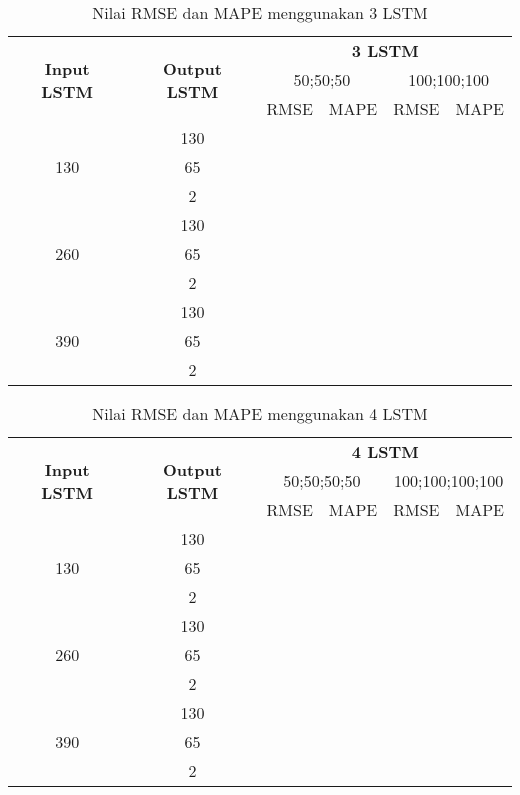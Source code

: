 \documentclass[../thesis.tex]{subfiles}
\begin{document}
\begin{table}[htp]
	\centering
	\begin{tabular}{|c|c|c|c|c|c|}
		\hline 
		\multirow{3}{*}{\textbf{Input LSTM}} & \multirow{3}{*}{\textbf{Output LSTM}} & \multicolumn{4}{c|}{\textbf{3 LSTM}} \\ \cline{3-6}
		&  & \multicolumn{2}{c|}{50;50;50}& \multicolumn{2}{c|}{100;100;100} \\ \cline{3-6}
		& & RMSE & MAPE& RMSE & MAPE\\
		\hline
		\multirow{3}{*}{130} & 130 & & & & \\
		& 65 & & & & \\
		& 2 & & & & \\
		\hline
		\multirow{3}{*}{260} & 130 & & & & \\
		& 65 & & & & \\
		& 2 & & & & \\
		\hline
		\multirow{3}{*}{390} & 130 & & & & \\
		& 65 & & & & \\
		& 2 & & & & \\
		\hline
	\end{tabular}
	\caption{Nilai RMSE dan MAPE menggunakan 3 LSTM}
	\label{3LSTM_result}
	\end{table} 

\begin{table}[htp]
	\centering
	\begin{tabular}{|c|c|c|c|c|c|}
		\hline 
		\multirow{3}{*}{\textbf{Input LSTM}} & \multirow{3}{*}{\textbf{Output LSTM}} & \multicolumn{4}{c|}{\textbf{4 LSTM}} \\ \cline{3-6}
		&  & \multicolumn{2}{c|}{50;50;50;50}& \multicolumn{2}{c|}{100;100;100;100} \\ \cline{3-6}
		& & RMSE & MAPE& RMSE & MAPE\\
		\hline
		\multirow{3}{*}{130} & 130 & & & & \\
		& 65 & & & & \\
		& 2 & & & & \\
		\hline
		\multirow{3}{*}{260} & 130 & & & & \\
		& 65 & & & & \\
		& 2 & & & & \\
		\hline
		\multirow{3}{*}{390} & 130 & & & & \\
		& 65 & & & & \\
		& 2 & & & & \\
		\hline
	\end{tabular}
	\caption{Nilai RMSE dan MAPE menggunakan 4 LSTM}
	\label{4LSTM_result}
	\end{table} 
\end{document}

